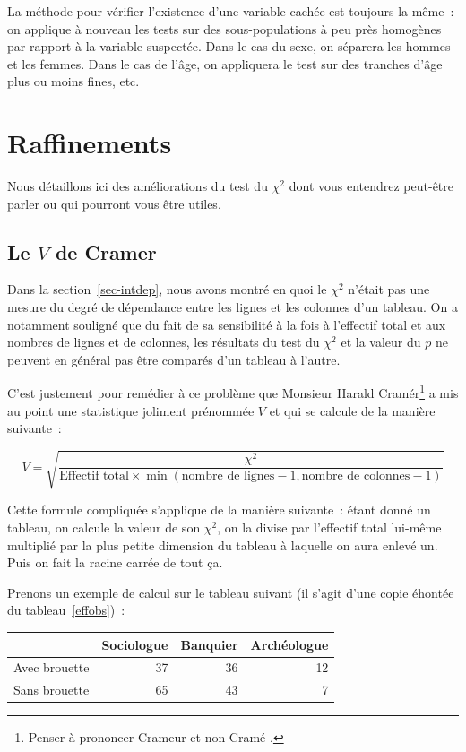 \documentclass[a4paper,10pt,twoside,francais]{report}
\newcommand{\chid}{$\chi^2$\xspace}
\begin{document}
La méthode pour vérifier l'existence d'une variable cachée est
toujours la même~: on applique à nouveau les tests sur des
sous-populations à peu près homogènes par rapport à la variable
suspectée. Dans le cas du sexe, on séparera les hommes et les
femmes. Dans le cas de l'âge, on appliquera le test sur des tranches
d'âge plus ou moins fines, etc.


\chapter{Raffinements}
\label{sec-raffin}

Nous détaillons ici des améliorations du test du \chid dont vous
entendrez peut-être parler ou qui pourront vous être utiles. 

\section{Le \texorpdfstring{$V$}{V} de Cramer}
\label{sec-vcramer}

Dans la section~\vref{sec-intdep}, nous avons montré en quoi le \chid
n'était pas une mesure du degré de dépendance entre les lignes et les
colonnes d'un tableau. On a notamment souligné que du fait de sa
sensibilité à la fois à l'effectif total et aux nombres de lignes et
de colonnes, les résultats du test du \chid et la valeur du $p$ ne
peuvent en général pas être comparés d'un tableau à l'autre.

C'est justement pour remédier à ce problème que Monsieur
Harald Cramér\footnote{Penser à prononcer \og Crameur \fg{} et non
  \og Cramé \fg{}.} a mis au point une statistique joliment prénommée
$V$ et qui se calcule de la manière suivante~:


$$V = \sqrt{\frac{\chi^2}{\text{Effectif total} \times \min ( 
    \text{nombre de lignes} - 1, \text{nombre de colonnes} - 1)}} $$

Cette formule compliquée s'applique de la manière suivante~: étant
donné un tableau, on calcule la valeur de son \chid, on la divise par
l'effectif total lui-même multiplié par la plus petite dimension du
tableau à laquelle on aura enlevé un. Puis on fait la racine carrée de
tout ça.

Prenons un exemple de calcul sur le tableau suivant (il s'agit d'une
copie éhontée du tableau~\vref{effobs})~:

\begin{table}[H]
  \begin{center}
    \begin{tabular}{lrrr}
      \toprule
      & Sociologue & Banquier & Archéologue \\
      \midrule
      Avec brouette &  37 & 36 & 12 \\
      Sans brouette &  65 & 43 & 7 \\
      \bottomrule
    \end{tabular}
  \end{center}
\end{table}
\end{document}
